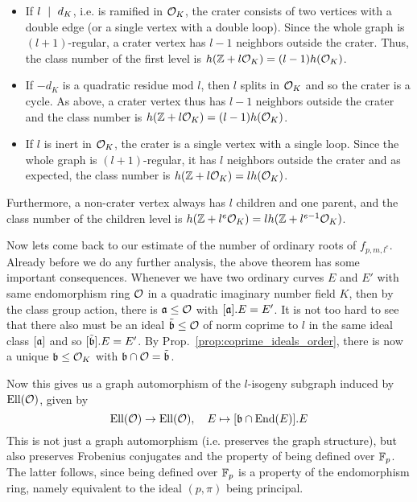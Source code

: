 \begin{itemize}
    \item If $l \ \mid \  d_K$, i.e. is ramified in $\mathcal{O}_K$, the crater consists of two vertices with a double edge (or a single vertex with a double loop).
    Since the whole graph is $(l + 1)$-regular, a crater vertex has $l - 1$ neighbors outside the crater.
    Thus, the class number of the first level is $h(\mathbb{Z} + l\mathcal{O}_K) = (l - 1)h(\mathcal{O}_K)$.
    \item If $-d_K$ is a quadratic residue mod $l$, then $l$ splits in $\mathcal{O}_K$ and so the crater is a cycle.
    As above, a crater vertex thus has $l - 1$ neighbors outside the crater and the class number is $h(\mathbb{Z} + l\mathcal{O}_K) = (l - 1)h(\mathcal{O}_K)$.
    \item If $l$ is inert in $\mathcal{O}_K$, the crater is a single vertex with a single loop.
    Since the whole graph is $(l + 1)$-regular, it has $l$ neighbors outside the crater and as expected, the class number is $h(\mathbb{Z} + l\mathcal{O}_K) = l h(\mathcal{O}_K)$.
\end{itemize}
Furthermore, a non-crater vertex always has $l$ children and one parent, and the class number of the children level is $h(\mathbb{Z} + l^e\mathcal{O}_K) = l h(\mathbb{Z} + l^{e - 1}\mathcal{O}_K)$.

Now lets come back to our estimate of the number of ordinary roots of $f_{p, m, l^e}$.
Already before we do any further analysis, the above theorem has some important consequences.
Whenever we have two ordinary curves $E$ and $E'$ with same endomorphism ring $\mathcal{O}$ in a quadratic imaginary number field $K$, then by the class group action, there is $\mathfrak{a} \leq \mathcal{O}$ with $[\mathfrak{a}].E = E'$.
It is not too hard to see that there also must be an ideal $\tilde{\mathfrak{b}} \leq \mathcal{O}$ of norm coprime to $l$ in the same ideal class $[\mathfrak{a}]$ and so $[\tilde{\mathfrak{b}}].E = E'$.
By Prop.~\ref{prop:coprime_ideals_order}, there is now a unique $\mathfrak{b} \leq \mathcal{O}_K$ with $\mathfrak{b} \cap \mathcal{O} = \tilde{\mathfrak{b}}$.

Now this gives us a graph automorphism of the $l$-isogeny subgraph induced by $\mathrm{Ell}(\mathcal{O})$, given by
\begin{equation*}
    \mathrm{Ell}(\mathcal{O}) \to \mathrm{Ell}(\mathcal{O}), \quad E \mapsto [\mathfrak{b} \cap \mathrm{End}(E)].E
\end{equation*}
This is not just a graph automorphism (i.e. preserves the graph structure), but also preserves Frobenius conjugates and the property of being defined over $\mathbb{F}_p$.
The latter follows, since being defined over $\mathbb{F}_p$ is a property of the endomorphism ring, namely equivalent to the ideal $(p, \pi)$ being principal.

